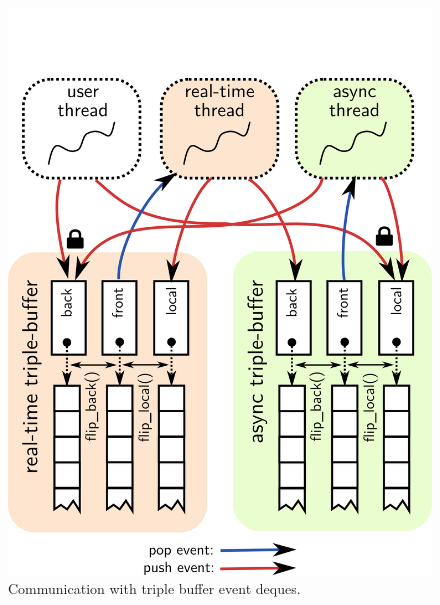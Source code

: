 \begin{figure}[h!]
  \centering
  \includegraphics[width=\textwidth]{pic/events.png}
  \caption{Communication with triple buffer event deques.}
  \label{fig:triplebuf}
\end{figure}

